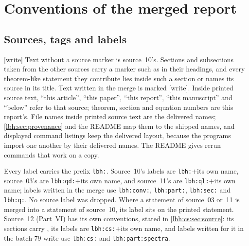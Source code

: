 \documentclass[11pt,letterpaper]{article}
\theoremstyle{definition}
\theoremstyle{remark}
\newcommand{\1}{\mathbf 1}
\newcommand{\wtag}{\textup{[write]}}%
\newcommand{\srctag}[1]{\texorpdfstring{\hspace{0.4em}{\normalfont\small\color{accent}[source #1]}}{ [source #1]}}
\begin{document}
\section{Conventions of the merged report}\label{lbh:conv:sec}

\subsection{Sources, tags and labels}
\wtag{} Text without a source marker is source~10's. Sections and subsections taken from the
other sources carry a marker such as \srctag{03} in their headings, and every theorem-like
statement they contribute lies inside such a section or names its source in its title. Text
written in the merge is marked \wtag. Inside printed source text, ``this article'', ``this
paper'', ``this report'', ``this manuscript'' and ``below'' refer to that source; theorem,
section and equation numbers are this report's. File names inside printed source text are the
delivered names; \cref{lbh:sec:provenance} and the README map them to the shipped names, and
displayed command listings keep the delivered layout, because the programs import one another by
their delivered names. The README gives rerun commands that work on a copy.

Every label carries the prefix \texttt{lbh:}. Source~10's labels are \texttt{lbh:}$+$its own
name, source~03's are \texttt{lbh:qd:}$+$its own name, and source~11's are
\texttt{lbh:ql:}$+$its own name; labels written in the merge use \texttt{lbh:conv:},
\texttt{lbh:part:}, \texttt{lbh:sec:} and \texttt{lbh:q:}. No source label was dropped.
Where a statement of source~03 or~11 is merged into a statement of source~10, its label sits on
the printed statement. Source~12 (Part~VI) has its own conventions, stated in
\cref{lbh:cs:sec:source}: its sections carry \srctag{12}, its labels are \texttt{lbh:cs:}$+$its own
name, and labels written for it in the batch-79 write use \texttt{lbh:cs:} and
\texttt{lbh:part:spectra}.
\end{document}
